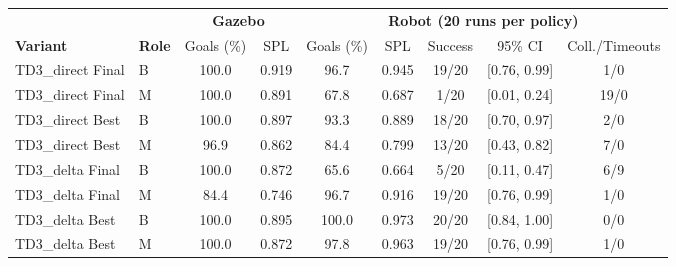 \begin{tabular}{llccccccc}
\midrule[1.5pt]
 & & \multicolumn{2}{c}{\textbf{Gazebo}} & \multicolumn{5}{c}{\textbf{Robot (20 runs per policy)}} \\
\cmidrule(lr){3-4}\cmidrule(lr){5-9}
\textbf{Variant} & \textbf{Role} & Goals (\%) & SPL & Goals (\%) & SPL & Success & 95\% CI & Coll./Timeouts \\
\midrule[1.5pt]
TD3\_direct Final & B & 100.0 & 0.919 & 96.7 & 0.945 & 19/20 & [0.76, 0.99] & 1/0 \\
TD3\_direct Final & M & 100.0 & 0.891 & 67.8 & 0.687 & 1/20 & [0.01, 0.24] & 19/0 \\
\midrule
TD3\_direct Best & B & 100.0 & 0.897 & 93.3 & 0.889 & 18/20 & [0.70, 0.97] & 2/0 \\
TD3\_direct Best & M & 96.9 & 0.862 & 84.4 & 0.799 & 13/20 & [0.43, 0.82] & 7/0 \\
\midrule
TD3\_delta Final & B & 100.0 & 0.872 & 65.6 & 0.664 & 5/20 & [0.11, 0.47] & 6/9 \\
TD3\_delta Final & M & 84.4 & 0.746 & 96.7 & 0.916 & 19/20 & [0.76, 0.99] & 1/0 \\
\midrule
TD3\_delta Best & B & 100.0 & 0.895 & 100.0 & 0.973 & 20/20 & [0.84, 1.00] & 0/0 \\
TD3\_delta Best & M & 100.0 & 0.872 & 97.8 & 0.963 & 19/20 & [0.76, 0.99] & 1/0 \\
\midrule[1.5pt]
\end{tabular}
